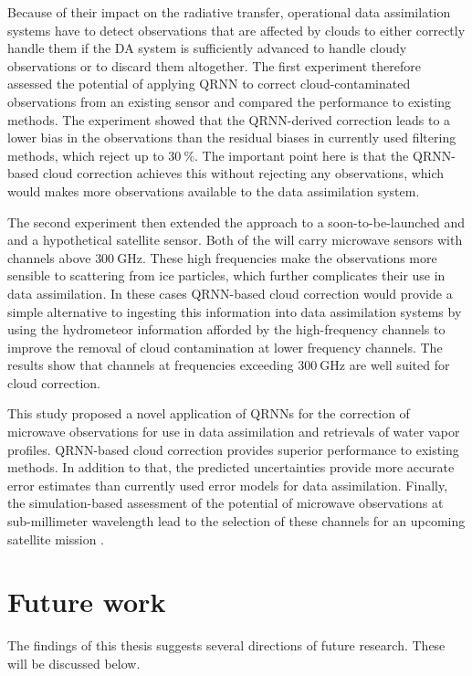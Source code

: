 Because of their impact on the radiative transfer, operational data assimilation
systems have to detect observations that are affected by clouds to either
correctly handle them if the DA system is sufficiently advanced to handle cloudy
observations or to discard them altogether. The first experiment therefore
assessed the potential of applying QRNN to correct cloud-contaminated
observations from an existing sensor and compared the performance to existing
methods. The experiment showed that the QRNN-derived correction leads to a lower
bias in the observations than the residual biases in currently used filtering
methods, which reject up to $\SI{30}{\percent}$. The important point here is that the QRNN-based
cloud correction achieves this without rejecting any observations, which would
makes more observations available to the data assimilation system.

The second experiment then extended the approach to a soon-to-be-launched and
and a hypothetical satellite sensor. Both of the will carry microwave sensors
with channels above $\SI{300}{\giga \hertz}$. These high frequencies make the
observations more sensible to scattering from ice particles, which further
complicates their use in data assimilation. In these cases QRNN-based cloud
correction would provide a simple alternative to ingesting this information into
data assimilation systems by using the hydrometeor information afforded by the
high-frequency channels to improve the removal of cloud contamination at lower
frequency channels. The results show that channels at frequencies exceeding
$\SI{300}{\giga \hertz}$ are well suited for cloud correction.

This study proposed a novel application of QRNNs for the correction of microwave
observations for use in data assimilation and retrievals of water vapor
profiles. QRNN-based cloud correction provides superior performance to existing
methods. In addition to that, the predicted uncertainties provide more accurate
error estimates than currently used error models for data assimilation.
Finally, the simulation-based assessment of the potential of microwave observations
at sub-millimeter wavelength lead to the selection of these channels for an
upcoming satellite mission \citep{arctic_weather_satellite}.

\section{Future work}

The findings of this thesis suggests several directions of future research.
These will be discussed below.

